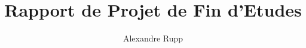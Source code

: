 \documentclass[liens,entete-ensimag,margeCorrection,onecolumn,12pt]{ensirapport}
\date{} %
\begin{document}
\title{Rapport de Projet de Fin d'Etudes}
\author{Alexandre Rupp}
\date{}

	\maketitle
 \thispagestyle{empty}
 
 
\newpage
\thispagestyle{fancy}

%  


\newpage
{}
\clearpage
\vspace*{-47pt}
\tableofcontents

\newpage
\listoffigures



\newpage
\printnoidxglossary[title={Glossaire}]

 
\newcommand{\lc}{\cellcolor{blue!60}}
\renewcommand{\arraystretch}{1.3}









\newpage



\newpage
\end{document}

